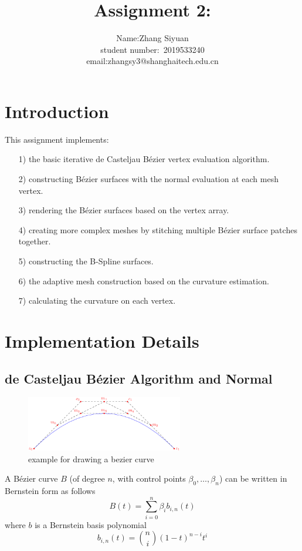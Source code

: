 \documentclass[acmtog]{acmart}
\title{Assignment 2:\\ {}}
\author{Name:\quad Zhang Siyuan  \\ student number:\ 2019533240
\\email:\quad zhangsy3@shanghaitech.edu.cn}
\begin{document}
\maketitle

\vspace*{2 ex}

\section{Introduction}
	This assignment implements:
\begin{itemize}
	\item [1)] the basic iterative de Casteljau Bézier vertex evaluation algorithm.
	\item [2)] constructing Bézier surfaces with the normal evaluation at each mesh vertex.
	\item [3)] rendering the Bézier surfaces based on the vertex array.
	\item [4)] creating more complex meshes by stitching multiple Bézier surface patches together.
	\item [5)] constructing the B-Spline surfaces.
	\item [6)] the adaptive mesh construction based on the curvature estimation.
	\item [7)] calculating the curvature on each vertex.
\end{itemize}

\section{Implementation Details}
\subsection{de Casteljau Bézier Algorithm and Normal}
\begin{figure}[h]
	\centering
	\includegraphics[height = 2.4cm]{bezier_curve_example.png}
	\caption{example for drawing a bezier curve}
\end{figure}

A Bézier curve $B$ (of degree $n$,
with control points $\beta_{0},\ldots ,\beta_{n}$)
can be written in Bernstein form as follows
$$
	B(t)=\sum _{i=0}^{n}\beta_{i}b_{i,n}(t)
$$
where $b$ is a Bernstein basis polynomial
$$
	b_{i,n}(t)={n \choose i}(1-t)^{n-i}t^{i}
$$
\end{document}
